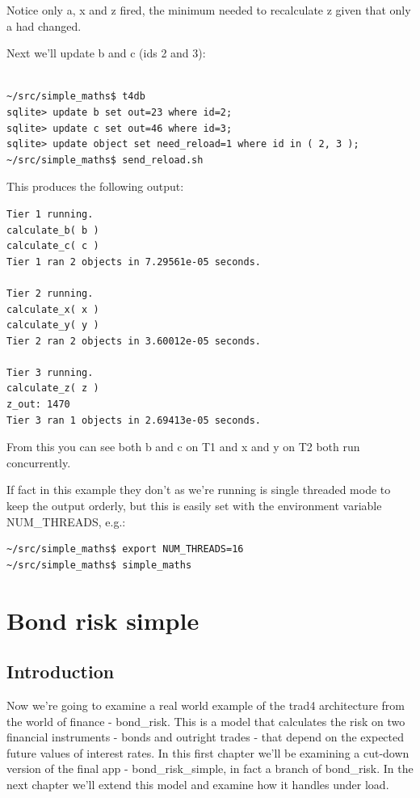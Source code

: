 \documentclass{report}
\begin{document}
Notice only a, x and z fired, the minimum needed to recalculate z given that only a had changed. 

Next we'll update b and c (ids 2 and 3):

\begin{verbatim}

~/src/simple_maths$ t4db
sqlite> update b set out=23 where id=2;
sqlite> update c set out=46 where id=3;
sqlite> update object set need_reload=1 where id in ( 2, 3 );
~/src/simple_maths$ send_reload.sh
\end{verbatim}

This produces the following output:

\begin{verbatim}
Tier 1 running.
calculate_b( b )
calculate_c( c )
Tier 1 ran 2 objects in 7.29561e-05 seconds.

Tier 2 running.
calculate_x( x )
calculate_y( y )
Tier 2 ran 2 objects in 3.60012e-05 seconds.

Tier 3 running.
calculate_z( z )
z_out: 1470
Tier 3 ran 1 objects in 2.69413e-05 seconds.
\end{verbatim}

From this you can see both b and c on T1 and x and y on T2 both run concurrently. 

If fact in this example they don't as we're running is single threaded mode to keep the output orderly, but this is easily set with the environment variable NUM_THREADS, e.g.:

\begin{verbatim}
~/src/simple_maths$ export NUM_THREADS=16
~/src/simple_maths$ simple_maths
\end{verbatim}

\chapter{Bond risk simple}

\section{Introduction}

Now we're going to examine a real world example of the trad4 architecture from the world of finance - bond_risk. This is a model that calculates the risk on two financial instruments - bonds and outright trades - that depend on the expected future values of interest rates. In this first chapter we'll be examining a cut-down version of the final app - bond_risk_simple, in fact a branch of bond_risk. In the next chapter we'll extend this model and examine how it handles under load.
\end{document}

